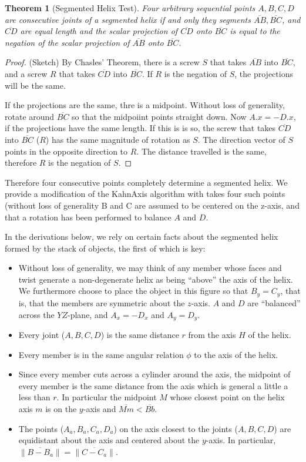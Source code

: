 \documentclass[11pt]{article}
\newtheorem{theorem}{Theorem}
\begin{document}
{\begin{theorem}[Segmented Helix Test]
  Four arbitrary sequential points $A,B,C,D$ are consecutive joints of a segmented helix if and only
  they segments $\overline{AB},\overline{BC}$, and $\overline{CD}$ are equal length and the scalar projection
  of $\overline{CD}$ onto $\overline{BC}$ is equal to the negation of the scalar projection of $\overline{AB}$ onto $\overline{BC}$.
\end{theorem}

\begin{proof}
  (Sketch) By Chasles' Theorem, there is a screw $S$ that takes $\overline{AB}$ into $\overline{BC}$, and a screw $R$ that
  takes  $\overline{CD}$ into $\overline{BC}$. If $R$ is the negation of $S$, the projections will be the same.

  If the projections are the same, thre is a midpoint. Without loss of generality, rotate around $\overline{BC}$ so that
  the midpoiint points straight down. Now $A.x = -D.x$, if the projections have the same length. If this is is so, the
  screw that takes $\overline{CD}$ into $\overline{BC}$ ($R$) has the same magnitude of rotation as $S$.
  The direction vector of $S$ points in the opposite direction to $R$. The distance travelled is the same, therefore $R$
  is the negation of $S$.
\end{proof}

Therefore four consecutive points completely determine a segmented helix. We provide a modification of the KahnAxis algorithm
with takes four such points (without loss of generality B and C are assumed to be centered on the z-axis, and that a
rotation has been performed to balance $A$ and $D$.


In the derivations below, we rely on certain facts about
the segmented helix formed by the stack of objects, the first
of which is key:
\begin{itemize}
\item Without loss of generality, we may think of any member whose faces
  and twist generate a non-degenerate helix as being ``above'' the
  axis of the helix. We furthermore choose to place the object in
  this figure so that $B_y = C_y$, that is, that the members are symmetric
  about the $z$-axis.
  $A$ and $D$ are ``balanced'' across the $YZ$-plane,
  and $A_x = -D_x$ and $A_y = D_y$.
\item Every joint ($A,B,C,D$) is the same distance $r$ from the axis $H$ of the helix.
\item Every member is in the same angular relation $\phi$ to the axis of the helix.
\item Since every member cuts across a cylinder around the axis,
  the midpoint of every member is the same distance from the axis
  which is general a little a less than $r$. In particular the midpoint $M$
  whose closest point on the helix axis $m$ is on the $y$-axis and
  $\overline{Mm} < \overline{Bb}$.
\item The points ($A_a,B_a,C_a,D_a$) on the axis closest to the joints ($A,B,C,D$)
  are equidistant about the axis and centered about the $y$-axis. In
  particular, $\| \overline{B - B_a} \| = \| \overline{C - C_a} \|$.
\end{itemize}

}
\end{document}
